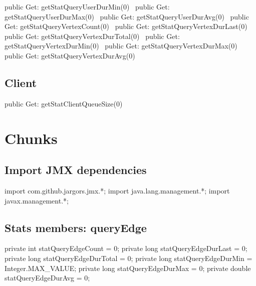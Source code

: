public \LA{}Get: getStatQueryUserDurMin(0)~{\nwtagstyle{}}\RA{}
public \LA{}Get: getStatQueryUserDurMax(0)~{\nwtagstyle{}}\RA{}
public \LA{}Get: getStatQueryUserDurAvg(0)~{\nwtagstyle{}}\RA{}
public \LA{}Get: getStatQueryVertexCount(0)~{\nwtagstyle{}}\RA{}
public \LA{}Get: getStatQueryVertexDurLast(0)~{\nwtagstyle{}}\RA{}
public \LA{}Get: getStatQueryVertexDurTotal(0)~{\nwtagstyle{}}\RA{}
public \LA{}Get: getStatQueryVertexDurMin(0)~{\nwtagstyle{}}\RA{}
public \LA{}Get: getStatQueryVertexDurMax(0)~{\nwtagstyle{}}\RA{}
public \LA{}Get: getStatQueryVertexDurAvg(0)~{\nwtagstyle{}}\RA{}
\nwendcode{}\nwdocspar

\subsection{Client}
\nwenddocs{}\plusendmoddef
public \LA{}Get: getStatClientQueueSize(0)~{\nwtagstyle{}}\RA{}
\nwendcode{}\nwdocspar

\section{Chunks}
\subsection{Import JMX dependencies}
\nwenddocs{}\endmoddef{}
import com.github.jargors.jmx.*;
import java.lang.management.*;
import javax.management.*;
\nwendcode{}\nwdocspar

\subsection{Stats members: queryEdge}
\nwenddocs{}\endmoddef{}
private int    statQueryEdgeCount    = 0;
private long   statQueryEdgeDurLast  = 0;
private long   statQueryEdgeDurTotal = 0;
private long   statQueryEdgeDurMin   = Integer.MAX_VALUE;
private long   statQueryEdgeDurMax   = 0;
private double statQueryEdgeDurAvg   = 0;
\nwendcode{}\nwdocspar

